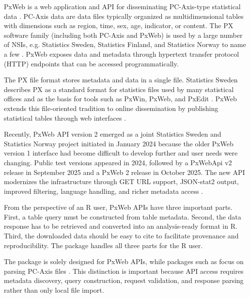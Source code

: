 PxWeb is a web application and API for disseminating PC-Axis-type statistical data \citep{PxToolsPxWeb2Intro}.
PC-Axis data are data files typically organized as multidimensional tables with dimensions such as region, time, sex, age, indicator, or content.
The PX software family (including both PC-Axis and PxWeb) is used by a large number of NSIs, e.g. Statistics Sweden, Statistics Finland, and Statistics Norway to name a few \citep{SCBPxPrograms,StatisticsFinlandPxSuite,StatisticsNorwayAPI}.
PxWeb exposes data and metadata through hypertext transfer protocol (HTTP) endpoints that can be accessed programmatically.

The PX file format stores metadata and data in a single file.
Statistics Sweden describes PX as a standard format for statistics files used by many statistical offices and as the basis for tools such as PxWin, PxWeb, and PxEdit \citep{SCBPxPrograms}.
PxWeb extends this file-oriented tradition to online dissemination by publishing statistical tables through web interfaces \citep{PxToolsPxWeb2Intro}.

Recently, PxWeb API version 2 emerged as a joint Statistics Sweden and Statistics Norway project initiated in January 2024 because the older PxWeb version 1 interface had become difficult to develop further and user needs were changing.
Public test versions appeared in 2024, followed by a PxWebApi v2 release in September 2025 and a PxWeb 2 release in October 2025.
The new API modernizes the infrastructure through GET URL support, JSON-stat2 output, improved filtering, language handling, and richer metadata access \citep{PxToolsPxWeb2Process,PxToolsPxWeb2Plans,PxToolsPxWebApi2UserGuide}.

From the perspective of an R user, PxWeb APIs have three important parts.
First, a table query must be constructed from table metadata.
Second, the data response has to be retrieved and converted into an analysis-ready format in R.
Third, the downloaded data should be easy to cite to facilitate provenance and reproducibility.
The  package handles all three parts for the R user.

The  package is solely designed for PxWeb APIs, while packages such as  focus on parsing PC-Axis files \citep{pxR}.
This distinction is important because API access requires metadata discovery, query construction, request validation, and response parsing rather than only local file import.

